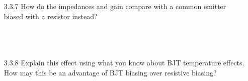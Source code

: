 \documentclass{article}
\begin{document}
\begin{enumerate}
	\item[3.3.7] How do the impedances and gain compare with a common emitter biased with a resistor instead?
		\\~\\~\\~\\
		
	\item[3.3.8] Explain this effect using what you know about BJT temperature effects. How may this be an advantage of BJT biasing over resistive biasing?
		\\~\\~\\~\\~\\~\\~\\~\\

\end{enumerate}
\end{document}
